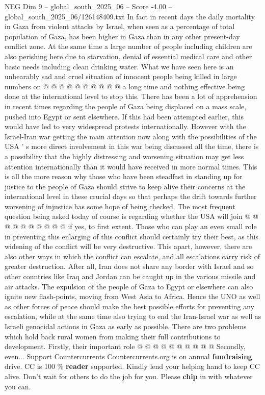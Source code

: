 \begin{textsample}{NEG Dim 9 – global\_south\_2025\_06 – Score -4.00 – global\_south\_2025\_06/126148409.txt}
In fact in recent days the daily mortality in Gaza from violent attacks by Israel, when seen as a percentage of total population of Gaza, has been higher in Gaza than in any other present-day conflict zone.
At the same time a large number of people including children are also perishing here due to starvation, denial of essential medical care and other basic needs including clean drinking water.
What we have seen here is an unbearably sad and cruel situation of innocent people being killed in large numbers on @ @ @ @ @ @ @ @ @ @ a long time and nothing effective being done at the international level to stop this.
There has been a lot of apprehension in recent times regarding the people of Gaza being displaced on a mass scale, pushed into Egypt or sent elsewhere.
If this had been attempted earlier, this would have led to very widespread protests internationally.
However with the Israel-Iran war getting the main attention now along with the possibilities of the USA ' s more direct involvement in this war being discussed all the time, there is a possibility that the highly distressing and worsening situation may get less attention internationally than it would have received in more normal times.
This is all the more reason why those who have been steadfast in standing up for justice to the people of Gaza should strive to keep alive their concerns at the international level in these crucial days so that perhaps the drift towards further worsening of injustice has some hope of being checked.
The most frequent question being asked today of course is regarding whether the USA will join @ @ @ @ @ @ @ @ @ @ if yes, to first extent.
Those who can play an even small role in preventing this enlarging of this conflict should certainly try their best, as this widening of the conflict will be very destructive.
This apart, however, there are also other ways in which the conflict can escalate, and all escalations carry risk of greater destruction.
After all, Iran does not share any border with Israel and so other countries like Iraq and Jordan can be caught up in the various missile and air attacks.
The expulsion of the people of Gaza to Egypt or elsewhere can also ignite new flash-points, moving from West Asia to Africa.
Hence the UNO as well as other forces of peace should make the best possible efforts for preventing any escalation, while at the same time also trying to end the Iran-Israel war as well as Israeli genocidal actions in Gaza as early as possible.
There are two problems which hold back rural women from making their full contributions to development.
Firstly, their important role @ @ @ @ @ @ @ @ @ @ Secondly, even...
Support Countercurrents Countercurrents.org is on annual \textbf{fundraising} drive.
CC is 100 \% \textbf{reader} supported.
Kindly lend your helping hand to keep CC alive.
Don't wait for others to do the job for you.
Please \textbf{chip} in with whatever you can.

\end{textsample}
